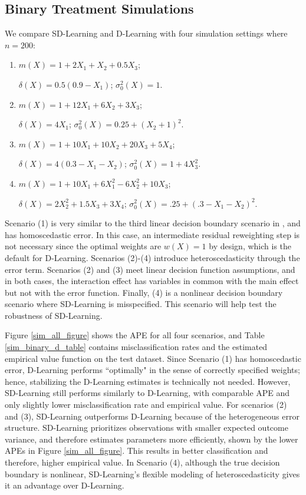 \documentclass[useAMS,usenatbib]{biom}
\begin{document}
\subsection{Binary Treatment Simulations} \label{subsec_simulations_binary}

We compare SD-Learning and D-Learning with four simulation settings where $n=200$:

\begin{enumerate}
    \item $m(X) = 1 + 2X_1 + X_2 + 0.5X_3$; 
    
    \noindent $\delta(X) = 0.5(0.9 - X_1) $; $\sigma_0^2(X) = 1$.
    \item $m(X) = 1 + 12X_1 + 6X_2 + 3X_3$; 
    
    \noindent $\delta(X) = 4X_1$; $\sigma_0^2(X) = 0.25 + (X_2 + 1)^2$.    
    \item $m(X) = 1 + 10X_1 + 10X_2 + 20X_3 + 5X_4$; 
    
    \noindent $\delta(X) = 4(0.3 - X_1 - X_2)$; $\sigma_0^2(X) = 1 + 4X_3^2$.
    \item $m(X) = 1 + 10X_1 + 6X_1^2 - 6X_2^2 + 10X_3$; 
    
    \noindent $\delta(X) = 2X_2^2 + 1.5X_3 + 3X_4$; $\sigma_0^2(X) = .25 + (.3 - X_1 - X_2)^2$.
\end{enumerate}
Scenario (1) is very similar to the third linear decision boundary scenario in \cite{qi_d-learning_2018}, and has homoscedastic error. In this case, an intermediate residual reweighting step is not necessary since the optimal weights are $w(X) = 1$ by design, which is the default for D-Learning. Scenarios (2)-(4) introduce heteroscedasticity through the error term. Scenarios (2) and (3) meet linear decision function assumptions, and in both cases, the interaction effect has variables in common with the main effect but not with the error function. Finally, (4) is a nonlinear decision boundary scenario where SD-Learning is misspecified. This scenario will help test the robustness of SD-Learning.

Figure \ref{sim_all_figure} shows the APE for all four scenarios, and Table \ref{sim_binary_d_table} contains misclassification rates and the estimated empirical value function on the test dataset. Since Scenario (1) has homoscedastic error, D-Learning performs ``optimally" in the sense of correctly specified weights; hence, stabilizing the D-Learning estimates is technically not needed. However, SD-Learning still performs similarly to D-Learning, with comparable APE and only slightly lower misclassification rate and empirical value. For scenarios (2) and (3), SD-Learning outperforms D-Learning because of the heterogeneous error structure. SD-Learning prioritizes observations with smaller expected outcome variance, and therefore estimates parameters more efficiently, shown by the lower APEs in Figure \ref{sim_all_figure}. This results in better classification and therefore, higher empirical value. In Scenario (4), although the true decision boundary is nonlinear, SD-Learning's flexible modeling of heteroscedasticity gives it an advantage over D-Learning.
\end{document}
